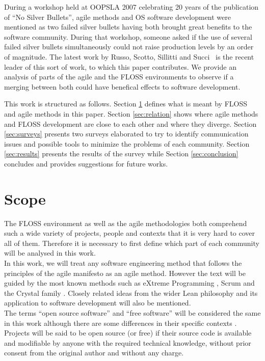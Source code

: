 \documentclass[lnbip]{svmultln}
\begin{document}
During a workshop \cite{conference:oopsla2007} held at OOPSLA 2007
celebrating 20 years of the publication of ``No Silver
Bullets''\cite{brooks1987}, agile methods and OS software development
were mentioned as two failed silver bullets having both brought great
benefits to the software community. During that workshop, someone
asked if the use of several failed silver bullets simultaneously could
not raise production levels by an order of magnitude. The latest work
by Russo, Scotto, Sillitti and Succi~\cite{sillitti2009} is the recent
leader of this sort of work, to which this paper contributes. We provide
an analysis of parts of the agile and the FLOSS environments to
observe if a merging between both could have benefical effects to
software development.

This work is structured as follows. Section \ref{sec:scope} defines
what is meant by FLOSS and agile methods in this paper. Section
\ref{sec:relation} shows where agile methods and FLOSS development are
close to each other and where they diverge. Section \ref{sec:surveys}
presents two surveys elaborated to try to identify communication
issues and possible tools to minimize the problems of each
community. Section \ref{sec:results} presents the results of the
survey while Section \ref{sec:conclusion} concludes and provides
suggestions for future works.

\section{Scope}
\label{sec:scope}

The FLOSS environment as well as the agile methodologies both
comprehend such a wide variety of projects, people and contexts that
it is very hard to cover all of them. Therefore it is necessary to
first define which part of each community will be analysed in this
work.
\\

In this work, we will treat any software engineering method that
follows the principles of the agile manifesto
\cite{url:agilemanifesto} as an agile method. However the text will be
guided by the most known methods such as eXtreme Programming
\cite{beck2004}, Scrum \cite{schwaber2004} and the Crystal family
\cite{cockburn2002}. Closely related ideas from the wider Lean
philosophy \cite{ohno1998} and its application to software development
\cite{poppendieck2005} will also be mentioned.
\\

The terms ``open source software'' and ``free software'' will be
considered the same in this work although there are some differences
in their specific contexts \cite{fogel2005}. Projects will be said to
be open source (or free) if their source code is available and
modifiable by anyone with the required technical knowledge, without
prior consent from the original author and without any charge.
\end{document}
